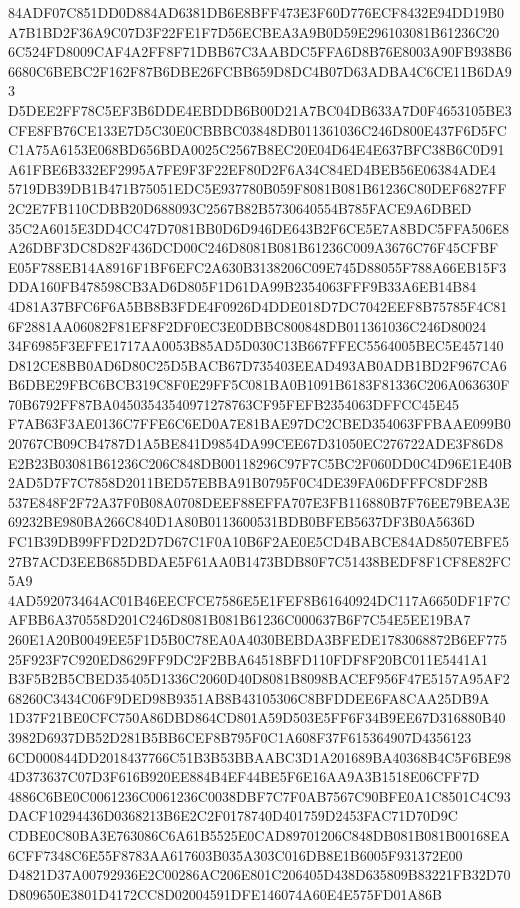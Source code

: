 \documentclass[UTF8,fontset=fandol,zihao=-4,a4paper]{ctexart}
\begin{document}
{{84ADF07C851DD0D884AD6381DB6E8BFF473E3F60D776ECF8432E94DD19B0A7B1BD2F36A9C07D3F22FE1F7D56ECBEA3A9B0D59E296103081B61236C20
6C524FD8009CAF4A2FF8F71DBB67C3AABDC5FFA6D8B76E8003A90FB938B66680C6BEBC2F162F87B6DBE26FCBB659D8DC4B07D63ADBA4C6CE11B6DA93
D5DEE2FF78C5EF3B6DDE4EBDDB6B00D21A7BC04DB633A7D0F4653105BE3CFE8FB76CE133E7D5C30E0CBBBC03848DB011361036C246D800E437F6D5FC
C1A75A6153E068BD656BDA0025C2567B8EC20E04D64E4E637BFC38B6C0D91A61FBE6B332EF2995A7FE9F3F22EF80D2F6A34C84ED4BEB56E06384ADE4
5719DB39DB1B471B75051EDC5E937780B059F8081B081B61236C80DEF6827FF2C2E7FB110CDBB20D688093C2567B82B5730640554B785FACE9A6DBED
35C2A6015E3DD4CC47D7081BB0D6D946DE643B2F6CE5E7A8BDC5FFA506E8A26DBF3DC8D82F436DCD00C246D8081B081B61236C009A3676C76F45CFBF
E05F788EB14A8916F1BF6EFC2A630B3138206C09E745D88055F788A66EB15F3DDA160FB478598CB3AD6D805F1D61DA99B2354063FFF9B33A6EB14B84
4D81A37BFC6F6A5BB8B3FDE4F0926D4DDE018D7DC7042EEF8B75785F4C816F2881AA06082F81EF8F2DF0EC3E0DBBC800848DB011361036C246D80024
34F6985F3EFFE1717AA0053B85AD5D030C13B667FFEC5564005BEC5E457140D812CE8BB0AD6D80C25D5BACB67D735403EEAD493AB0ADB1BD2F967CA6
B6DBE29FBC6BCB319C8F0E29FF5C081BA0B1091B6183F81336C206A063630F70B6792FF87BA04503543540971278763CF95FEFB2354063DFFCC45E45
F7AB63F3AE0136C7FFE6C6ED0A7E81BAE97DC2CBED354063FFBAAE099B020767CB09CB4787D1A5BE841D9854DA99CEE67D31050EC276722ADE3F86D8
E2B23B03081B61236C206C848DB00118296C97F7C5BC2F060DD0C4D96E1E40B2AD5D7F7C7858D2011BED57EBBA91B0795F0C4DE39FA06DFFFC8DF28B
537E848F2F72A37F0B08A0708DEEF88EFFA707E3FB116880B7F76EE79BEA3E69232BE980BA266C840D1A80B0113600531BDB0BFEB5637DF3B0A5636D
FC1B39DB99FFD2D2D7D67C1F0A10B6F2AE0E5CD4BABCE84AD8507EBFE527B7ACD3EEB685DBDAE5F61AA0B1473BDB80F7C51438BEDF8F1CF8E82FC5A9
4AD592073464AC01B46EECFCE7586E5E1FEF8B61640924DC117A6650DF1F7CAFBB6A370558D201C246D8081B081B61236C000637B6F7C54E5EE19BA7
260E1A20B0049EE5F1D5B0C78EA0A4030BEBDA3BFEDE1783068872B6EF77525F923F7C920ED8629FF9DC2F2BBA64518BFD110FDF8F20BC011E5441A1
B3F5B2B5CBED35405D1336C2060D40D8081B8098BACEF956F47E5157A95AF268260C3434C06F9DED98B9351AB8B43105306C8BFDDEE6FA8CAA25DB9A
1D37F21BE0CFC750A86DBD864CD801A59D503E5FF6F34B9EE67D316880B403982D6937DB52D281B5BB6CEF8B795F0C1A608F37F615364907D4356123
6CD000844DD2018437766C51B3B53BBAABC3D1A201689BA40368B4C5F6BE984D373637C07D3F616B920EE884B4EF44BE5F6E16AA9A3B1518E06CFF7D
4886C6BE0C0061236C0061236C0038DBF7C7F0AB7567C90BFE0A1C8501C4C93DACF10294436D0368213B6E2C2F0178740D401759D2453FAC71D70D9C
CDBE0C80BA3E763086C6A61B5525E0CAD89701206C848DB081B081B00168EA6CFF7348C6E55F8783AA617603B035A303C016DB8E1B6005F931372E00
D4821D37A00792936E2C00286AC206E801C206405D438D635809B83221FB32D70D809650E3801D4172CC8D02004591DFE146074A60E4E575FD01A86B
}}
\end{document}
